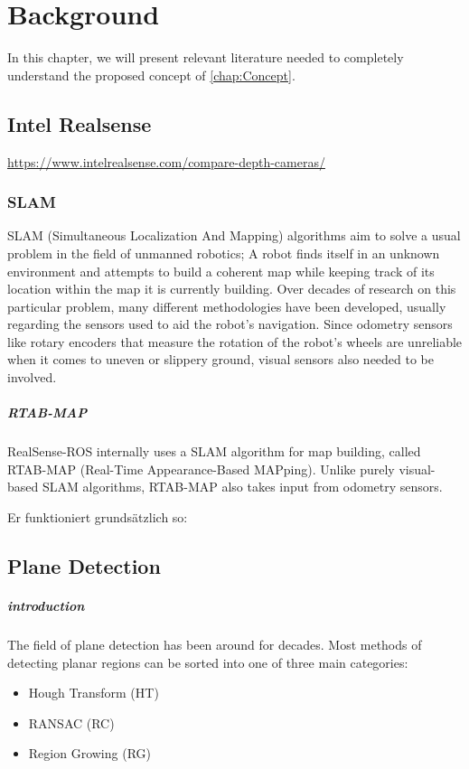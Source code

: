 \documentclass[main.tex]{subfiles}
\begin{document}
\chapter{Background}\label{chap:Background}
In this chapter, we will present relevant literature needed to completely understand the proposed concept of \autoref{chap:Concept}.


\section{Intel Realsense}
\href{https://www.intelrealsense.com/compare-depth-cameras/}{https://www.intelrealsense.com/compare-depth-cameras/}

\subsection*{SLAM}
SLAM (Simultaneous Localization And Mapping) algorithms aim to solve a usual problem in the field of unmanned robotics;
A robot finds itself in an unknown environment and attempts to build a coherent map while keeping track of its location within the map it is currently building.
Over decades of research on this particular problem, many different methodologies have been developed, usually regarding the sensors used to aid the robot's navigation.
Since odometry sensors like rotary encoders that measure the rotation of the robot's wheels are unreliable when it comes to uneven or slippery ground, visual sensors also needed to be involved.

\paragraph*{RTAB-MAP}
RealSense-ROS internally uses a SLAM algorithm for map building, called RTAB-MAP (Real-Time Appearance-Based MAPping).
Unlike purely visual-based SLAM algorithms, RTAB-MAP also takes input from odometry sensors. %


Er funktioniert grundsätzlich so:

\section{Plane Detection}

\paragraph*{introduction}
The field of plane detection has been around for decades. Most methods of detecting planar regions can be sorted into one of three main categories:
\begin{itemize}
    \item Hough Transform (HT)
    \item RANSAC (RC)
    \item Region Growing (RG)
\end{itemize}
\end{document}
